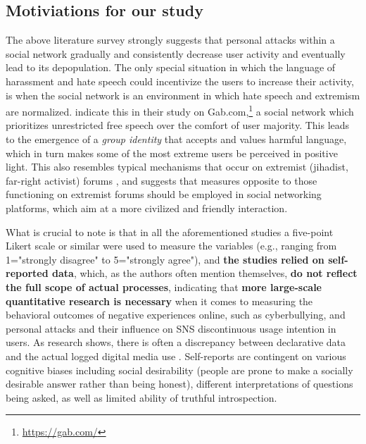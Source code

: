 \documentclass[a4paper,fleqn]{cas-dc}
\begin{document}
\subsection{Motiviations for our study}


The above literature survey strongly suggests that personal attacks within a social network gradually and consistently decrease user activity and eventually lead to its depopulation. The only special situation in which the language of harassment and hate speech could incentivize the users to increase their activity, is when the social network is an environment in which hate speech and extremism are normalized. \citet{mathew2019temporal} indicate this in their study on Gab.com,\footnote{\url{https://gab.com/}} a social network which prioritizes unrestricted free speech over the comfort of user majority.
This leads to the emergence of a \textit{group identity} that accepts and values harmful language, which in turn makes some of the most extreme users be perceived in positive light. This also resembles typical mechanisms that occur on extremist (jihadist, far-right activist) forums \citep{de2008stormfront, chua2019understanding}, and suggests that measures opposite to those functioning on extremist forums should be employed in social networking platforms, which aim at a more civilized and friendly interaction.



What is crucial to note is that in all the aforementioned studies a five-point Likert scale or similar were used to measure the variables (e.g., ranging from 1="strongly disagree" to 5="strongly agree"), and \textbf{the studies relied on self-reported data}, which, as the authors often mention themselves, \textbf{do not reflect the full scope of actual processes}, indicating that \textbf{more large-scale quantitative research is necessary} when it comes to measuring the behavioral outcomes of negative experiences online, such as cyberbullying, and personal attacks and their influence on SNS discontinuous usage intention in users.
As research shows, there is often a discrepancy between declarative data and the actual logged digital media use \citep{Parry2021discrepancies, Ellis2019smartphoneScales}.  Self-reports are contingent on various cognitive biases including social desirability (people are prone to make a socially desirable answer rather than being honest), different interpretations of questions being asked, as well as limited ability of truthful introspection.
\end{document}
